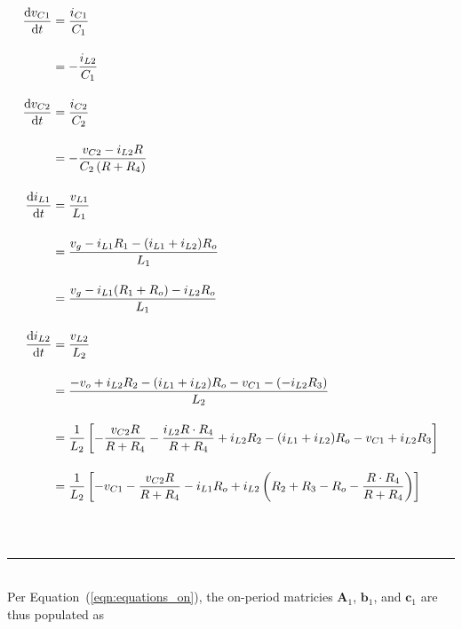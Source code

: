 \begin{align*}
\frac{\mathrm{d}v_{C1}}{\mathrm{d}t} &= \frac{i_{C1}}{C_1}\\[11pt]
&= {-}\frac{i_{L2}}{C_1}
\\[11pt]
\frac{\mathrm{d}v_{C2}}{\mathrm{d}t} &= \frac{i_{C2}}{C_2}\\[11pt]
&= {-}\frac{v_{C2} - i_{L2}R}{C_2 \left(R + R_4\right)}
\\[11pt]
\frac{\mathrm{d}i_{L1}}{\mathrm{d}t} &= \frac{v_{L1}}{L_1}\\[11pt]
&= \frac{v_g - i_{L1}R_1 - (i_{L1} + i_{L2})R_o}{L_1}\\[11pt]
&= \frac{v_g - i_{L1}(R_1 + R_o) - i_{L2}R_o}{L_1}
\\[11pt]
\frac{\mathrm{d}i_{L2}}{\mathrm{d}t} &= \frac{v_{L2}}{L_2}\\[11pt]
&= \frac{{-} v_o + i_{L2}R_2 - (i_{L1} + i_{L2})R_o - v_{C1} - ({-} i_{L2}R_3)}{L_2}\\[11pt]
&= \frac{1}{L_2} \left[{-} \frac{v_{C2}R}{R + R_4} - \frac{i_{L2} R \cdot R_4}{R + R_4} + i_{L2}R_2 - (i_{L1} + i_{L2})R_o - v_{C1} + i_{L2}R_3\right]\\[11pt]
&= \frac{1}{L_2} \left[{-} v_{C1} - \frac{v_{C2}R}{R + R_4} - i_{L1}R_o + i_{L2} \left(R_2 + R_3 - R_o - \frac{R \cdot R_4}{R + R_4}\right)\right]
\end{align*}
\endgroup
~\\
~\rule{\textwidth}{0.5pt}
~\\
Per Equation~(\ref{eqn:equations_on}), the on-period matricies $\boldsymbol{A}_1$, $\boldsymbol{b}_1$, and $\boldsymbol{c}_1$ are thus populated as
